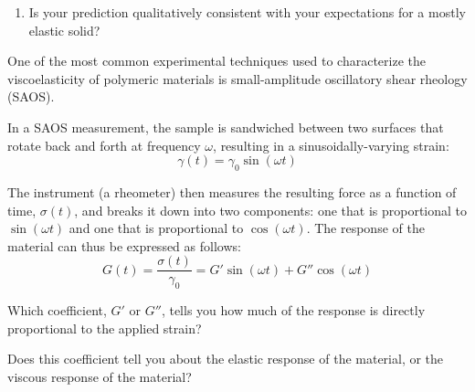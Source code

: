 \begin{activity}
\begin{ctqs}
\begin{enumerate}
					\begin{solution}[1.25in]
					\end{solution}
				\item Is your prediction qualitatively consistent with your expectations for a mostly elastic solid?
	
					\begin{solution}[1.5in]
					\end{solution}
			\end{enumerate}
		
\end{ctqs}

\begin{model}
\label{model:rheology}

	One of the most common experimental techniques used to characterize the viscoelasticity of polymeric materials is small-amplitude oscillatory shear rheology (SAOS).
	
	In a SAOS measurement, the sample is sandwiched between two surfaces that rotate back and forth at frequency $\omega$, resulting in a sinusoidally-varying strain:
	\begin{equation*}
		\gamma(t) = \gamma_0 \sin(\omega t)
	\end{equation*}
	
	The instrument (a rheometer) then measures the resulting force as a function of time, $\sigma(t)$, and breaks it down into two components: one that is proportional to $\sin(\omega t)$ and one that is proportional to $\cos(\omega t)$. The response of the material can thus be expressed as follows:
	\begin{equation*}
		G(t) = \frac{\sigma(t)}{\gamma_0} = G' \sin(\omega t) + G'' \cos(\omega t)
	\end{equation*}

\end{model}

\begin{ctqs}
		
		\question Which coefficient, $G'$ or $G''$, tells you how much of the response is directly proportional to the applied strain?
	
					\begin{solution}[1.1in]
					\end{solution}
		
		\question Does this coefficient tell you about the elastic response of the material, or the viscous response of the material?
	

\end{ctqs}
\end{activity}
